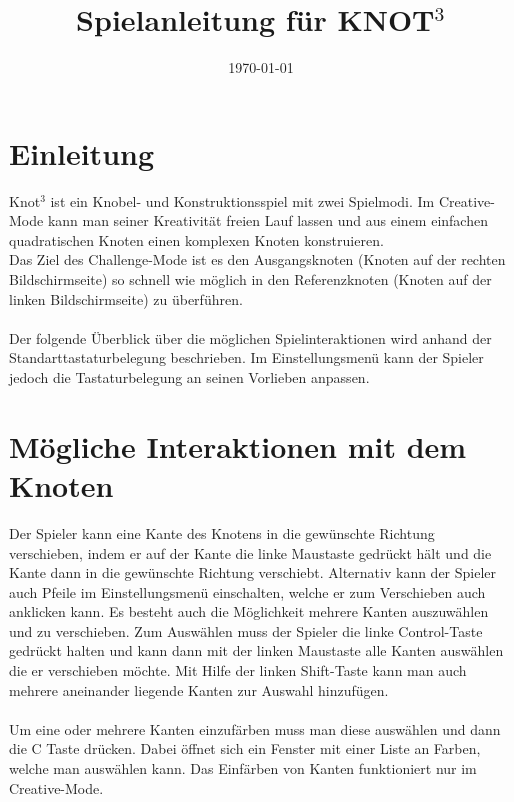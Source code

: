 \documentclass{report}
\begin{document}
\title{\textbf{Spielanleitung für KNOT$^3$}}
\date{\today}

\maketitle

\section*{Einleitung}
Knot$^3$ ist ein Knobel- und Konstruktionsspiel mit zwei Spielmodi.
Im Creative-Mode kann man seiner Kreativität freien Lauf lassen und aus einem einfachen quadratischen Knoten einen komplexen Knoten konstruieren.\\
Das Ziel des Challenge-Mode ist es den Ausgangsknoten (Knoten auf der rechten Bildschirmseite) so schnell wie möglich in den Referenzknoten (Knoten auf der linken Bildschirmseite) zu überführen. \\~\\
Der folgende Überblick über die möglichen Spielinteraktionen wird anhand der Standarttastaturbelegung beschrieben. Im Einstellungsmenü kann der Spieler jedoch die Tastaturbelegung an seinen Vorlieben anpassen.\\

\section*{Mögliche Interaktionen mit dem Knoten}
Der Spieler kann eine Kante des Knotens in die gewünschte Richtung verschieben, indem er auf der Kante die linke Maustaste gedrückt hält und die Kante dann in die gewünschte Richtung verschiebt. Alternativ kann der Spieler auch Pfeile im Einstellungsmenü einschalten,  welche er zum Verschieben auch anklicken kann. Es besteht auch die Möglichkeit mehrere Kanten auszuwählen und zu verschieben. Zum Auswählen muss der Spieler die linke Control-Taste gedrückt halten und kann dann mit der linken Maustaste alle Kanten auswählen die er verschieben möchte. Mit Hilfe der linken Shift-Taste kann man auch mehrere aneinander liegende Kanten zur Auswahl hinzufügen.\\~\\
Um eine oder mehrere Kanten einzufärben muss man diese auswählen und dann die C Taste drücken. Dabei öffnet sich ein Fenster mit einer Liste an Farben, welche man auswählen kann. Das Einfärben von Kanten funktioniert nur im Creative-Mode.
\end{document}
